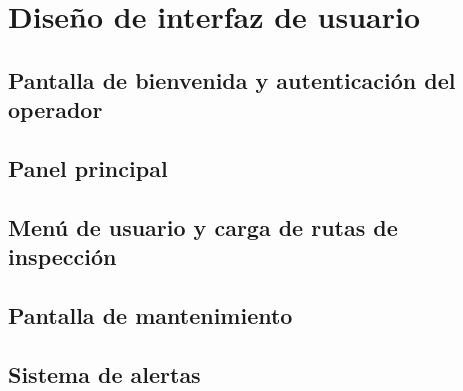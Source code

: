 \documentclass[../../General.tex]{subfiles}
\begin{document}
\section{Diseño de interfaz de usuario}
\subsection{Pantalla de bienvenida y autenticación del operador}
\subsection{Panel principal}
\subsection{Menú de usuario y carga de rutas de inspección}
\subsection{Pantalla de mantenimiento}
\subsection{Sistema de alertas}
\end{document}
